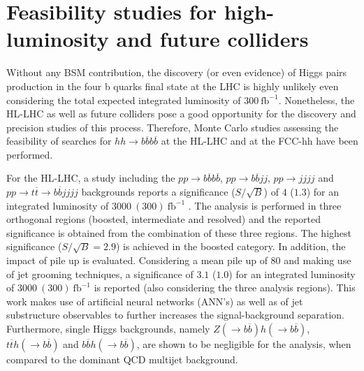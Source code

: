 \section{Feasibility studies for high-luminosity and future colliders}
\label{section:feasibility}



Without any BSM contribution, the discovery (or even evidence) of Higgs pairs production in the four b quarks final state at the LHC is highly unlikely even considering the total expected integrated luminosity of $300~\text{fb}^{-1}$. Nonetheless, the HL-LHC as well as future colliders pose a good opportunity for the discovery and precision studies of this process. Therefore, Monte Carlo studies assessing the feasibility of searches for $hh\rightarrow b\overline{b}b\overline{b}$ at the HL-LHC and at the FCC-hh have been performed.

For the HL-LHC, a study including the $pp\rightarrow b\overline{b}b\overline{b}$, $pp\rightarrow b\overline{b}jj$, $pp\rightarrow jjjj$ and $pp\rightarrow t\overline{t}\rightarrow b\overline{b}jjjj$ backgrounds reports a significance ($S/\sqrt{B}$) of $4$ ($1.3$) for an integrated luminosity of $3000~(300)~\text{fb}^{-1}$ \cite{hhFeasibility}. The analysis is performed in three orthogonal regions (boosted, intermediate and resolved) and the reported significance is obtained from the combination of these three regions. The highest significance ($S/\sqrt{B}=2.9$) is achieved in the boosted category. In addition, the impact of pile up is evaluated. Considering a mean pile up of 80 and making use of jet grooming techniques, a significance of $3.1$ ($1.0$) for an integrated luminosity of $3000~(300)~\text{fb}^{-1}$ is reported (also considering the three analysis regions). This work makes use of artificial neural networks (ANN's) as well as of jet substructure observables to further increases the signal-background separation. Furthermore, single Higgs backgrounds, namely $Z(\rightarrow b\overline{b})h(\rightarrow b\overline{b})$, $t\overline{t}h(\rightarrow b\overline{b})$ and $b\overline{b}h(\rightarrow b\overline{b})$, are shown to be negligible for the analysis, when compared to the dominant QCD multijet background.

